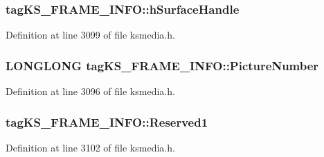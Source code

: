 \subsubsection[{\texorpdfstring{h\+Surface\+Handle}{hSurfaceHandle}}]{ tag\+K\+S\+\_\+\+F\+R\+A\+M\+E\+\_\+\+I\+N\+F\+O\+::h\+Surface\+Handle}\hypertarget{structtag_k_s___f_r_a_m_e___i_n_f_o_a1875e5986c03a09d88eb89a13db527c3}{}\label{structtag_k_s___f_r_a_m_e___i_n_f_o_a1875e5986c03a09d88eb89a13db527c3}


Definition at line 3099 of file ksmedia.\+h.

\subsubsection[{\texorpdfstring{Picture\+Number}{PictureNumber}}]{\setlength{\rightskip}{0pt plus 5cm}L\+O\+N\+G\+L\+O\+NG tag\+K\+S\+\_\+\+F\+R\+A\+M\+E\+\_\+\+I\+N\+F\+O\+::\+Picture\+Number}\hypertarget{structtag_k_s___f_r_a_m_e___i_n_f_o_aae3fb36ed8f84f35b82e548d1a5375ca}{}\label{structtag_k_s___f_r_a_m_e___i_n_f_o_aae3fb36ed8f84f35b82e548d1a5375ca}


Definition at line 3096 of file ksmedia.\+h.

\subsubsection[{\texorpdfstring{Reserved1}{Reserved1}}]{ tag\+K\+S\+\_\+\+F\+R\+A\+M\+E\+\_\+\+I\+N\+F\+O\+::\+Reserved1}\hypertarget{structtag_k_s___f_r_a_m_e___i_n_f_o_a6469e953f2d56616722570f4b4584336}{}\label{structtag_k_s___f_r_a_m_e___i_n_f_o_a6469e953f2d56616722570f4b4584336}


Definition at line 3102 of file ksmedia.\+h.

